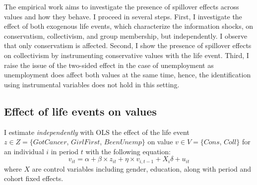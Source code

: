 The empirical work aims to investigate the presence of spillover effects across values and how they behave. I proceed in several steps. First, I investigate the effect of both exogenous life events, which characterize the information shocks, on conservatism, collectivism, and group membership, but independently. I observe that only conservatism is affected. Second, I show the presence of spillover effects on collectivism by instrumenting conservative values with the life event. Third, I raise the issue of the two-sided effect in the case of unemployment as unemployment does affect both values at the same time, hence, the identification using instrumental variables does not hold in this setting. 

\subsection{Effect of life events on values}

I estimate \textit{independently} with OLS the effect of the life event $z\in Z=\{GotCancer$, $GirlFirst$, $BeenUnemp\}$ on value $v\in V=\{Cons$, $Coll\}$ for an individual $i$ in period $t$ with the following equation:
\begin{equation}\label{chap3-eq:est-indep}
    v_{it} = \alpha + \beta \times z_{it} + \eta \times v_{i,t-1} + X_{i} \delta + u_{it}
\end{equation}
where $X$ are control variables including gender, education, along with period and cohort fixed effects. 

